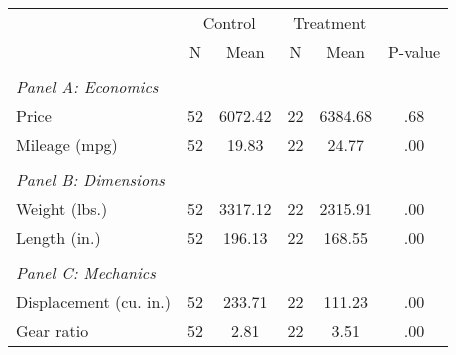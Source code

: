 \begin{tabular}{@{}lccccc@{}} \toprule   & \multicolumn{2}{c}{Control} & \multicolumn{2}{c}{Treatment} &  \\
                    &           N&        Mean&           N&        Mean&     P-value\\
\midrule
\shortstack{\vspace{0.2cm}\\ \textit{Panel A: Economics}}&            &            &            &            &            \\
Price               &          52&     6072.42&          22&     6384.68&         .68\\
Mileage (mpg)       &          52&       19.83&          22&       24.77&         .00\\
\shortstack{\vspace{0.4cm}\\ \textit{Panel B: Dimensions}}&            &            &            &            &            \\
Weight (lbs.)       &          52&     3317.12&          22&     2315.91&         .00\\
Length (in.)        &          52&      196.13&          22&      168.55&         .00\\
\shortstack{\vspace{0.4cm}\\ \textit{Panel C: Mechanics}}&            &            &            &            &            \\
Displacement (cu. in.)&          52&      233.71&          22&      111.23&         .00\\
Gear ratio          &          52&        2.81&          22&        3.51&         .00\\
\bottomrule \end{tabular}

